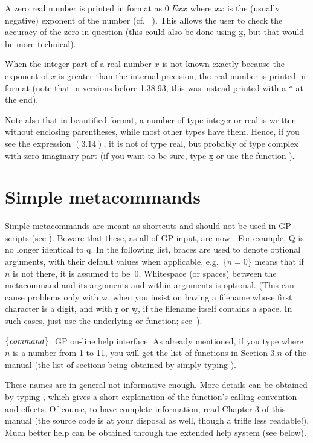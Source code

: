 
\noindent
A zero real number is printed in  format as $0.Exx$ where $xx$ is
the (usually negative)  exponent of the number (cf.\ %
). This allows the user to check the accuracy of the zero
in question (this could also be done using \b{x}, but that would be more
technical).

When the integer part of a real number $x$ is not known exactly because the
exponent of $x$ is greater than the internal precision, the real number is
printed in  format (note that in versions before 1.38.93, this was
instead printed with a $*$ at the end).

Note also that in beautified format, a number of type integer or real is
written without enclosing parentheses, while most other types have them.
Hence, if you see the expression $( 3.14 )$, it is not of type real, but
probably of type complex with zero imaginary part (if you want to be sure, type
\b{x} or use the function ).

\section{Simple metacommands}\label{se:meta}

\noindent
Simple metacommands are meant as shortcuts and should not be used in GP
scripts (see ). Beware that these, as all of GP input,
are now . For example, \b{Q} is no longer identical to
\b{q}. In the following list, braces are used to denote optional arguments,
with their default values when applicable, e.g.~$\{n=0\}$ means that if $n$
is not there, it is assumed to be~$0$. Whitespace (or spaces) between the
metacommand and its arguments and within arguments is optional. (This can
cause problems only with \b{w}, when you insist on having a filename whose
first character is a digit, and with \b{r} or \b{w}, if the filename itself
contains a space. In such cases, just use the underlying  or
 function; see~).

 $\{\hbox{\it command\/}\}$: GP on-line help interface.
As already mentioned, if you type  where $n$ is a number from 1
to 11, you will get the list of functions in Section $3.n$ of the manual
(the list of sections being obtained by simply typing ).
\label{se:exthelp}

These names are in general not informative enough. More details can be
obtained by typing , which gives a short explanation of
the function's calling convention and effects. Of course, to have complete
information, read Chapter 3 of this manual (the source code is at your
disposal as well, though a trifle less readable!). Much better help can be
obtained through the extended help system (see below).

